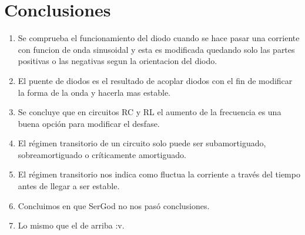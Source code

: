\documentclass[a4paper,12pt]{report}
\begin{document}
\chapter*{Conclusiones}
\begin{enumerate}
\item Se comprueba el funcionamiento del diodo cuando se hace pasar una corriente con funcion de onda sinusoidal y esta es modificada quedando solo las partes positivas o las negativas segun la orientacion del diodo.
\item El puente de diodos es el resultado de acoplar diodos con el fin de modificar la forma de la onda y hacerla mas estable.
\item Se concluye que en circuitos RC y RL el aumento de la frecuencia es una buena opción para modificar el desfase.
\item El régimen transitorio de un circuito solo puede ser subamortiguado, sobreamortiguado o críticamente amortiguado.
\item El régimen transitorio nos indica como fluctua la corriente a través del tiempo antes de llegar a ser estable.
\item Concluimos en que SerGod no nos pasó conclusiones.
\item Lo mismo que el de arriba :v.
\end{enumerate}
\end{document}
